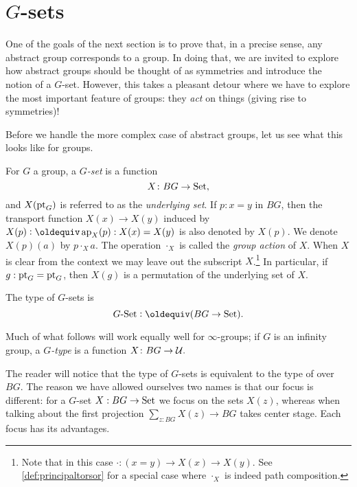 \section{$G$-sets}
\label{sec:gsets}

One of the goals of the next section is to prove that, in a precise sense, any abstract group corresponds to a group.  In doing that, we are invited to explore how abstract groups should be thought of as symmetries and introduce the notion of a $G$-set.  However, this takes a pleasant detour where we have to explore the most important feature of groups: they \emph{act} on things (giving rise to symmetries)!

Before we handle the more complex case of abstract groups, 
let us see what this looks like for groups.

\begin{definition}
  For $G$ a group, a \emph{$G$-set} is a function
  $$X\colon BG\to\mathord{\mathrm{Set}},$$
and $X(\mathrm{pt}_G)$ is referred to as the \emph{underlying set}.
If $p:x=y$ in $BG$, then the transport function $X(x)\to X(y)$ induced
by $X(p)\defeq\ap{X}(p) : X(x)=X(y)$ is also denoted by $X(p)$.
We denote $X(p)(a)$ by $p\cdot_X a$.
The operation $\cdot_X$ is called the \emph{group action} of $X$.
When $X$ is clear from the context we may leave out the 
subscript $X$.\footnote{%
Note that in this case $\cdot: (x=y)\to X(x) \to X(y)$. 
See \cref{def:principaltorsor} for a special case 
where $\cdot_X$ is indeed path composition.}
In particular, if $g:\mathrm{pt}_{G}=\mathrm{pt}_{G}$, 
then $X(g)$ is a permutation of the underlying set of $X$. 

The type of $G$-sets is $$\GSet\defequi(BG\to\Set).$$
\end{definition}
\begin{remark}
  Much of what follows will work equally well for $\infty$-groups; if $G$ is an infinity group, a \emph{$G$-type} is a function $X\colon BG\to{\mathcal{U}}.$
\end{remark}

\begin{remark}
  The reader will notice that the type of $G$-sets is equivalent to the 
type of \coverings over $BG$. %
The reason we have allowed ourselves two names is that our focus is different: for a $G$-set $X:BG\to\mathord{\mathrm{Set}}$ we focus on the sets $X(z)$, whereas when talking about \coverings the first projection $\sum_{z:BG}X(z)\to BG$ takes center stage.  Each focus has its advantages.

\end{remark}

